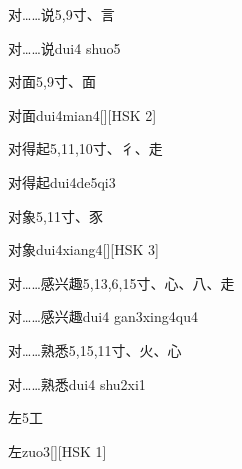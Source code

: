 \begin{entry}{对……说}{5,9}{⼨、⾔}
  \begin{phonetics}{对……说}{dui4 shuo5}
  \end{phonetics}
\end{entry}

\begin{entry}{对面}{5,9}{⼨、⾯}
  \begin{phonetics}{对面}{dui4mian4}[][HSK 2]
  \end{phonetics}
\end{entry}

\begin{entry}{对得起}{5,11,10}{⼨、⼻、⾛}
  \begin{phonetics}{对得起}{dui4de5qi3}
  \end{phonetics}
\end{entry}

\begin{entry}{对象}{5,11}{⼨、⾗}
  \begin{phonetics}{对象}{dui4xiang4}[][HSK 3]
  \end{phonetics}
\end{entry}

\begin{entry}{对……感兴趣}{5,13,6,15}{⼨、⼼、⼋、⾛}
  \begin{phonetics}{对……感兴趣}{dui4 gan3xing4qu4}
  \end{phonetics}
\end{entry}

\begin{entry}{对……熟悉}{5,15,11}{⼨、⽕、⼼}
  \begin{phonetics}{对……熟悉}{dui4 shu2xi1}
  \end{phonetics}
\end{entry}

\begin{entry}{左}{5}{⼯}
  \begin{phonetics}{左}{zuo3}[][HSK 1]
  \end{phonetics}
\end{entry}

